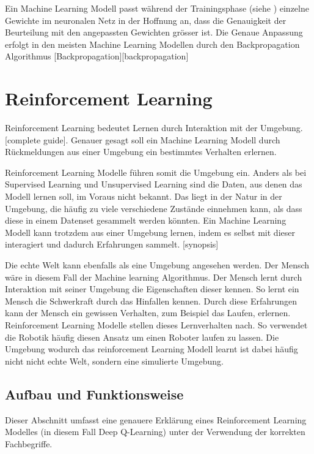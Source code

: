 Ein Machine Learning Modell passt während der Trainingsphase (siehe
) einzelne Gewichte im neuronalen Netz in der
Hoffnung an, dass die Genauigkeit der Beurteilung mit den angepassten Gewichten
grösser ist. Die Genaue Anpassung erfolgt in den meisten Machine Learning
Modellen durch den Backpropagation Algorithmus [Backpropagation][backpropagation]



\section{Reinforcement Learning}
\label{chap:t_rl}
Reinforcement Learning bedeutet Lernen durch Interaktion mit der Umgebung.
[complete guide]. Genauer gesagt soll ein Machine Learning Modell durch
Rückmeldungen aus einer Umgebung ein bestimmtes Verhalten erlernen.

Reinforcement Learning Modelle führen somit die Umgebung ein. Anders als bei
Supervised Learning und Unsupervised Learning sind die Daten, aus denen das
Modell lernen soll, im Voraus nicht bekannt. Das liegt in der Natur in der
Umgebung, die häufig zu viele verschiedene Zustände einnehmen kann, als dass
diese in einem Datenset gesammelt werden könnten. Ein Machine Learning Modell
kann trotzdem aus einer Umgebung lernen, indem es selbst mit dieser interagiert
und dadurch Erfahrungen sammelt. [synopsis]

Die echte Welt kann ebenfalls als eine Umgebung angesehen werden. Der Mensch
wäre in diesem Fall der Machine learning Algorithmus. Der Mensch lernt durch
Interaktion mit seiner Umgebung die Eigenschaften dieser kennen. So lernt ein
Mensch die Schwerkraft durch das Hinfallen kennen. Durch diese Erfahrungen kann
der Mensch ein gewissen Verhalten, zum Beispiel das Laufen, erlernen.
Reinforcement Learning Modelle stellen dieses Lernverhalten nach. So verwendet
die Robotik häufig diesen Ansatz um einen Roboter laufen zu lassen. Die Umgebung
wodurch das reinforcement Learning Modell learnt ist dabei häufig nicht nicht
echte Welt, sondern eine simulierte Umgebung.


\subsection{Aufbau und Funktionsweise}
Dieser Abschnitt umfasst eine genauere Erklärung eines Reinforcement Learning
Modelles (in diesem Fall Deep Q-Learning) unter der Verwendung der korrekten
Fachbegriffe.

